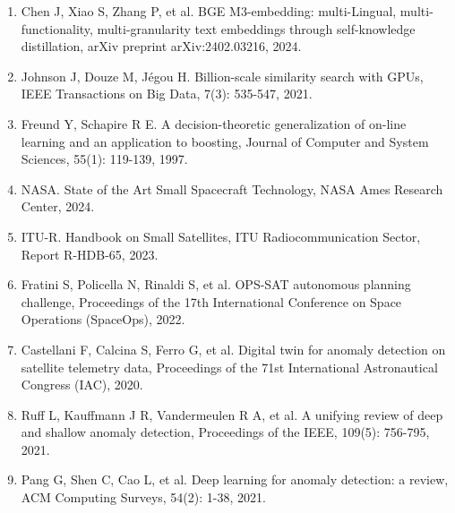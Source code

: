\documentclass[12pt, a4paper]{article}
\begin{document}
\begin{enumerate}
    \item Chen J, Xiao S, Zhang P, et al. BGE M3-embedding: multi-Lingual, multi-functionality, multi-granularity text embeddings through self-knowledge distillation, arXiv preprint arXiv:2402.03216, 2024.
    \item Johnson J, Douze M, J{\'e}gou H. Billion-scale similarity search with GPUs, IEEE Transactions on Big Data, 7(3): 535-547, 2021.
    \item Freund Y, Schapire R E. A decision-theoretic generalization of on-line learning and an application to boosting, Journal of Computer and System Sciences, 55(1): 119-139, 1997.
    \item NASA. State of the Art Small Spacecraft Technology, NASA Ames Research Center, 2024.
    \item ITU-R. Handbook on Small Satellites, ITU Radiocommunication Sector, Report R-HDB-65, 2023.
    \item Fratini S, Policella N, Rinaldi S, et al. OPS-SAT autonomous planning challenge, Proceedings of the 17th International Conference on Space Operations (SpaceOps), 2022.
    \item Castellani F, Calcina S, Ferro G, et al. Digital twin for anomaly detection on satellite telemetry data, Proceedings of the 71st International Astronautical Congress (IAC), 2020.
    \item Ruff L, Kauffmann J R, Vandermeulen R A, et al. A unifying review of deep and shallow anomaly detection, Proceedings of the IEEE, 109(5): 756-795, 2021.
    \item Pang G, Shen C, Cao L, et al. Deep learning for anomaly detection: a review, ACM Computing Surveys, 54(2): 1-38, 2021.

\end{enumerate}
\end{document}
